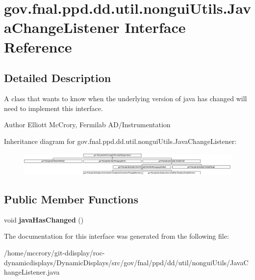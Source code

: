 \hypertarget{interfacegov_1_1fnal_1_1ppd_1_1dd_1_1util_1_1nonguiUtils_1_1JavaChangeListener}{\section{gov.\-fnal.\-ppd.\-dd.\-util.\-nongui\-Utils.\-Java\-Change\-Listener Interface Reference}
\label{interfacegov_1_1fnal_1_1ppd_1_1dd_1_1util_1_1nonguiUtils_1_1JavaChangeListener}
}


\subsection{Detailed Description}
A class that wants to know when the underlying version of java has changed will need to implement this interface.

\begin{DoxyAuthor}{Author}
Elliott Mc\-Crory, Fermilab A\-D/\-Instrumentation 
\end{DoxyAuthor}
Inheritance diagram for gov.\-fnal.\-ppd.\-dd.\-util.\-nongui\-Utils.\-Java\-Change\-Listener\-:\begin{figure}[H]
\begin{center}
\leavevmode
\includegraphics[height=1.209503cm]{interfacegov_1_1fnal_1_1ppd_1_1dd_1_1util_1_1nonguiUtils_1_1JavaChangeListener}
\end{center}
\end{figure}
\subsection*{Public Member Functions}
\begin{DoxyCompactItemize}
\item 
\hypertarget{interfacegov_1_1fnal_1_1ppd_1_1dd_1_1util_1_1nonguiUtils_1_1JavaChangeListener_af445b8c9b305e7493a08dc75266e2c7b}{void {\bfseries java\-Has\-Changed} ()}\label{interfacegov_1_1fnal_1_1ppd_1_1dd_1_1util_1_1nonguiUtils_1_1JavaChangeListener_af445b8c9b305e7493a08dc75266e2c7b}

\end{DoxyCompactItemize}


The documentation for this interface was generated from the following file\-:\begin{DoxyCompactItemize}
\item 
/home/mccrory/git-\/ddisplay/roc-\/dynamicdisplays/\-Dynamic\-Displays/src/gov/fnal/ppd/dd/util/nongui\-Utils/Java\-Change\-Listener.\-java\end{DoxyCompactItemize}
